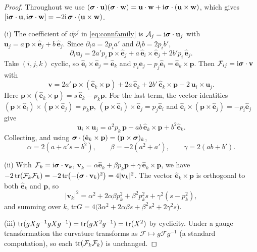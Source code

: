 \begin{proof}
Throughout we use $(\boldsymbol{\sigma}\cdot\mathbf u)(\boldsymbol{\sigma}\cdot\mathbf w)=\mathbf u\cdot\mathbf w+\mathrm{i}\boldsymbol{\sigma}\cdot(\mathbf u\times\mathbf w)$, which gives $[\mathrm{i}\boldsymbol{\sigma}\cdot\mathbf u,\mathrm{i}\boldsymbol{\sigma}\cdot\mathbf w]=-2\mathrm{i}\,\boldsymbol{\sigma}\cdot(\mathbf u\times\mathbf w)$.

(i) The coefficient of $\dd p^j$ in \eqref{eq:connfamily} is $\mathcal A_j=\mathrm{i}\boldsymbol{\sigma}\cdot\mathbf u_j$ with $\mathbf u_j=a\,\mathbf p\times\hat{\mathbf e}_j+b\,\hat{\mathbf e}_j$. Since $\partial_ia=2p_ia'$ and $\partial_ib=2p_ib'$,
\[
\partial_i\mathbf u_j=2a'p_i\,\mathbf p\times\hat{\mathbf e}_j+a\,\hat{\mathbf e}_i\times\hat{\mathbf e}_j+2b'p_i\,\hat{\mathbf e}_j .
\]
Take $(i,j,k)$ cyclic, so $\hat{\mathbf e}_i\times\hat{\mathbf e}_j=\hat{\mathbf e}_k$ and $p_i\hat{\mathbf e}_j-p_j\hat{\mathbf e}_i=\hat{\mathbf e}_k\times\mathbf p$. Then $\mathcal F_{ij}=\mathrm{i}\boldsymbol{\sigma}\cdot\mathbf v$ with
\[
\mathbf v=2a'\,\mathbf p\times(\hat{\mathbf e}_k\times\mathbf p)+2a\,\hat{\mathbf e}_k+2b'\,\hat{\mathbf e}_k\times\mathbf p-2\,\mathbf u_i\times\mathbf u_j .
\]
Here $\mathbf p\times(\hat{\mathbf e}_k\times\mathbf p)=s\,\hat{\mathbf e}_k-p_k\mathbf p$. For the last term, the vector identities $(\mathbf p\times\hat{\mathbf e}_i)\times(\mathbf p\times\hat{\mathbf e}_j)=p_k\mathbf p$, $(\mathbf p\times\hat{\mathbf e}_i)\times\hat{\mathbf e}_j=p_j\hat{\mathbf e}_i$ and $\hat{\mathbf e}_i\times(\mathbf p\times\hat{\mathbf e}_j)=-p_i\hat{\mathbf e}_j$ give
\[
\mathbf u_i\times\mathbf u_j=a^2p_k\,\mathbf p-ab\,\hat{\mathbf e}_k\times\mathbf p+b^2\hat{\mathbf e}_k .
\]
Collecting, and using $\boldsymbol{\sigma}\cdot(\hat{\mathbf e}_k\times\mathbf p)=(\mathbf p\times\boldsymbol{\sigma})_k$,
\[
\alpha=2(a+a's-b^2),\qquad \beta=-2(a^2+a'),\qquad \gamma=2(ab+b').
\]

(ii) With $\mathcal F_k=\mathrm{i}\boldsymbol{\sigma}\cdot\mathbf v_k$, $\mathbf v_k=\alpha\hat{\mathbf e}_k+\beta p_k\mathbf p+\gamma\,\hat{\mathbf e}_k\times\mathbf p$, we have $-2\operatorname{tr}(\mathcal F_k\mathcal F_k)=-2\operatorname{tr}\bigl(-(\boldsymbol{\sigma}\cdot\mathbf v_k)^2\bigr)=4|\mathbf v_k|^2$. The vector $\hat{\mathbf e}_k\times\mathbf p$ is orthogonal to both $\hat{\mathbf e}_k$ and $\mathbf p$, so
\[
|\mathbf v_k|^2=\alpha^2+2\alpha\beta p_k^2+\beta^2p_k^2s+\gamma^2(s-p_k^2),
\]
and summing over $k$, $\mathrm{tr}G=4\bigl(3\alpha^2+2\alpha\beta s+\beta^2s^2+2\gamma^2s\bigr)$.

(iii) $\operatorname{tr}(gXg^{-1}gXg^{-1})=\operatorname{tr}(gX^2g^{-1})=\operatorname{tr}(X^2)$ by cyclicity. Under a gauge transformation the curvature transforms as $\mathcal F\mapsto g\mathcal Fg^{-1}$ (a standard computation), so each $\operatorname{tr}(\mathcal F_k\mathcal F_k)$ is unchanged.
\end{proof}


